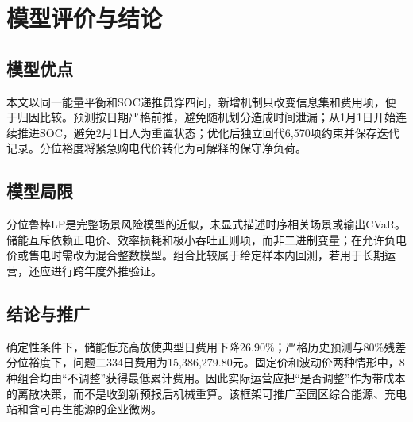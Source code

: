 \section{模型评价与结论}
\subsection{模型优点}
本文以同一能量平衡和SOC递推贯穿四问，新增机制只改变信息集和费用项，便于归因比较。预测按日期严格前推，避免随机划分造成时间泄漏；从1月1日开始连续推进SOC，避免2月1日人为重置状态；优化后独立回代6,570项约束并保存迭代记录。分位裕度将紧急购电代价转化为可解释的保守净负荷。
\subsection{模型局限}
分位鲁棒LP是完整场景风险模型的近似，未显式描述时序相关场景或输出CVaR。储能互斥依赖正电价、效率损耗和极小吞吐正则项，而非二进制变量；在允许负电价或售电时需改为混合整数模型。组合比较属于给定样本内回测，若用于长期运营，还应进行跨年度外推验证。
\subsection{结论与推广}
确定性条件下，储能低充高放使典型日费用下降26.90\%；严格历史预测与80\%残差分位裕度下，问题二334日费用为15,386,279.80元。固定价和波动价两种情形中，8种组合均由“不调整”获得最低累计费用。因此实际运营应把“是否调整”作为带成本的离散决策，而不是收到新预报后机械重算。该框架可推广至园区综合能源、充电站和含可再生能源的企业微网。
